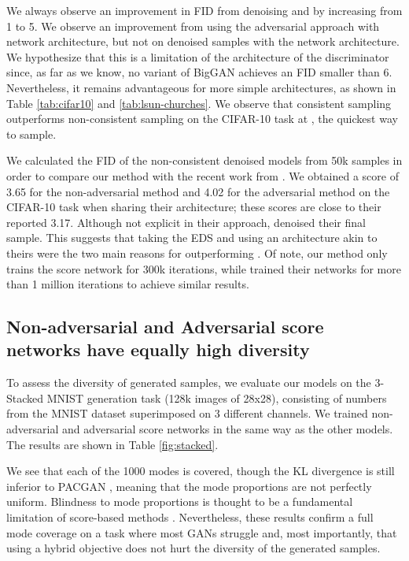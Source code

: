 \documentclass{article} \usepackage{iclr2021_conference_notitle,times}
\theoremstyle{definition}
\theoremstyle{definition}
\begin{document}
We always observe an improvement in FID from denoising and by increasing  from 1 to 5. 
We observe an improvement from using the adversarial approach with \citet{song2019generative} network architecture, but not on denoised samples with the \citet{ho2020denoising} network architecture. We hypothesize that this is a limitation of the architecture of the discriminator since, as far as we know, no variant of BigGAN achieves an FID smaller than 6. Nevertheless, it remains advantageous for more simple architectures, as shown in Table \ref{tab:cifar10} and \ref{tab:lsun-churches}. We observe that consistent sampling outperforms non-consistent sampling on the CIFAR-10 task at , the quickest way to sample. 


We calculated the FID of the non-consistent denoised models from 50k samples in order to compare our method with the recent work from \citet{ho2020denoising}. We obtained a score of 3.65 for the non-adversarial method and 4.02 for the adversarial method on the CIFAR-10 task when sharing their architecture; these scores are close to their reported 3.17. Although not explicit in their approach, \citet{ho2020denoising} denoised their final sample. This suggests that taking the EDS and using an architecture akin to theirs were the two main reasons for outperforming \citet{song2020improved}.  Of note, our method only trains the score network for 300k iterations, while \citet{ho2020denoising} trained their networks for more than 1 million iterations to achieve similar results.

\subsection{Non-adversarial and Adversarial score networks have equally high diversity}\label{sec:diversity}

To assess the diversity of generated samples, we evaluate our models on the 3-Stacked MNIST generation task \citep{metz2016unrolled} (128k images of 28x28), consisting of numbers from the MNIST dataset \citep{lecun1998gradient} superimposed on 3 different channels. We trained non-adversarial and adversarial score networks in the same way as the other models. The results are shown in Table \ref{fig:stacked}. 

We see that each of the 1000 modes is covered, though the KL divergence is still inferior to PACGAN \citep{lin2018pacgan}, meaning that the mode proportions are not perfectly uniform. Blindness to mode proportions is thought to be a fundamental limitation of score-based methods \citep{wenliang2020blindness}. Nevertheless, these results confirm a full mode coverage on a task where most GANs struggle and, most importantly, that using a hybrid objective does not hurt the diversity of the generated samples.
\end{document}

